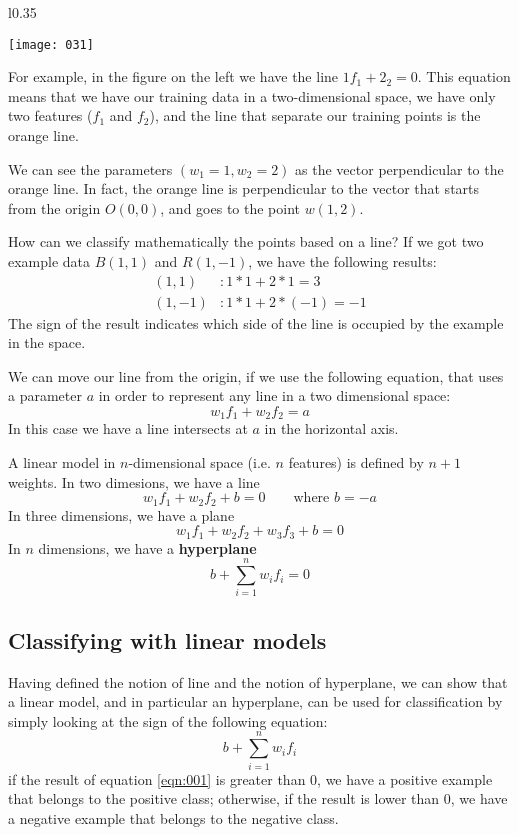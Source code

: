 \begin{example}
\begin{wrapfigure}{l}{0.35\textwidth}
\begin{center}
    \texttt{[image: 031]}
    \label{fig:031}
\end{center}
\end{wrapfigure}
For example, in the figure on the left we have the line \(1f_1+2_2 = 0\). This equation means that we have our training data in a two-dimensional space, we have only two features (\(f_1\) and \(f_2\)), and the line that separate our training points is the orange line.

We can see the parameters \((w_1=1,w_2=2)\) as the vector perpendicular to the orange line. In fact, the orange line is perpendicular to the vector that starts from the origin \(O(0,0)\), and goes to the point \(w(1,2)\).

How can we classify mathematically the points based on a line? If we got two example data \(B(1,1)\) and \(R(1,-1)\), we have the following results:
\begin{align*}
(1,1) &: 1*1+2*1=3\\
(1,-1) &: 1*1+2*(-1)=-1
\end{align*}
The sign of the result indicates which side of the line is occupied by the example in the space.

\end{example}

We can move our line from the origin, if we use the following equation, that uses a parameter \(a\) in order to represent any line in a two dimensional space:
\[w_1f_1+w_2f_2=a\]
In this case we have a line intersects at \(a\) in the horizontal axis.

A linear model in \(n\)-dimensional space (i.e. \(n\) features) is defined by \(n+1\) weights. In two dimesions, we have a line 
\begin{equation*}
    w_1f_1+w_2f_2+b=0 \qquad \text{where } b=-a
\end{equation*}
In three dimensions, we have a plane
\[w_1f_1+w_2f_2+w_3f_3+b=0\]
In \(n\) dimensions, we have a \textbf{hyperplane}
\begin{equation}
    b+\sum_{i=1}^nw_if_i=0
\end{equation}

\subsection{Classifying with linear models}
Having defined the notion of line and the notion of hyperplane, we can show that a linear model, and in particular an hyperplane, can be used for classification by simply looking at the sign of the following equation:
\begin{equation}
\label{eqn:001}
b+\sum_{i=1}^nw_if_i
\end{equation}
if the result of equation \ref{eqn:001} is greater than \(0\), we have a positive example that belongs to the positive class; otherwise, if the result is lower than \(0\), we have a negative example that belongs to the negative class.

